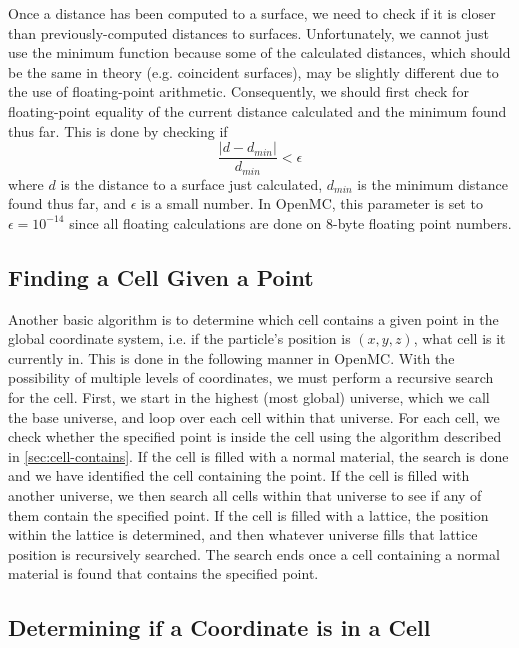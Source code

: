 Once a distance has been computed to a surface, we need to check if it is closer
than previously-computed distances to surfaces. Unfortunately, we cannot just
use the minimum function because some of the calculated distances, which should
be the same in theory (e.g. coincident surfaces), may be slightly different due
to the use of floating-point arithmetic. Consequently, we should first check for
floating-point equality of the current distance calculated and the minimum found
thus far. This is done by checking if
\begin{equation}
  \label{eq:fp-distance}
  \frac{| d - d_{min} |}{d_{min}} < \epsilon
\end{equation}
where $d$ is the distance to a surface just calculated, $d_{min}$ is
the minimum distance found thus far, and $\epsilon$ is a small number. In
OpenMC, this parameter is set to $\epsilon = 10^{-14}$ since all floating
calculations are done on 8-byte floating point numbers.

\subsection{Finding a Cell Given a Point}
\label{sec:find-cell}

Another basic algorithm is to determine which cell contains a given point in the
global coordinate system, i.e. if the particle's position is $(x,y,z)$, what
cell is it currently in. This is done in the following manner in OpenMC. With
the possibility of multiple levels of coordinates, we must perform a recursive
search for the cell. First, we start in the highest (most global) universe,
which we call the base universe, and loop over each cell within that
universe. For each cell, we check whether the specified point is inside the cell
using the algorithm described in \autoref{sec:cell-contains}. If the cell is
filled with a normal material, the search is done and we have identified the
cell containing the point. If the cell is filled with another universe, we then
search all cells within that universe to see if any of them contain the
specified point. If the cell is filled with a lattice, the position within the
lattice is determined, and then whatever universe fills that lattice position is
recursively searched. The search ends once a cell containing a normal material
is found that contains the specified point.

\subsection{Determining if a Coordinate is in a Cell}
\label{sec:cell-contains}

